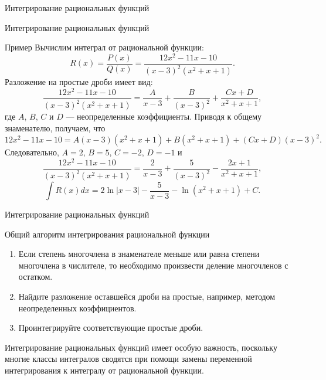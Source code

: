 \documentclass[8pt]{beamer}
\begin{document}
\begin{frame}{Интегрирование рациональных функций}

\end{frame}

\begin{frame}{Интегрирование рациональных функций}

\begin{block}{Пример}
Вычислим интеграл от рациональной функции:
$$R(x) = \frac{P(x)}{Q(x)} =  \frac{12 x^2-11 x-10}{(x-3)^2 \left(x^2+x+1\right)}.$$
Разложение на простые дроби имеет вид:
$$\frac{12 x^2-11 x-10}{(x-3)^2 \left(x^2+x+1\right)} = \frac{A}{x-3} + \frac{B}{(x-3)^2}+\frac{C x+D}{x^2+x+1},$$
где $A$, $B$, $C$ и $D$ --- неопределенные коэффициенты. Приводя к общему знаменателю, получаем, что
$$ 12x^2-11x-10=A(x-3)(x^2+x+1)+B(x^2+x+1)+(Cx+D)(x-3)^2.$$
Следовательно, $A=2$, $B=5$, $C=-2$, $D=-1$ и
$$\frac{12 x^2-11 x-10}{(x-3)^2 \left(x^2+x+1\right)} = \frac{2}{x-3}+\frac{5}{(x-3)^2}-\frac{2 x+1}{x^2+x+1},$$
$$\int R(x)dx = 2\ln|x-3| - \frac{5}{x-3}  - \ln(x^2+x+1)+C.$$
\end{block}
\end{frame}

\begin{frame}{Интегрирование рациональных функций}

\begin{block}{Общий алгоритм интегрирования рациональной функции}
\begin{enumerate}
\item Если степень многочлена в знаменателе меньше или равна степени многочлена в числителе, то необходимо произвести деление многочленов с остатком.
\item Найдите разложение оставшейся дроби на простые, например, методом неопределенных коэффициентов.
\item Проинтегрируйте соответствующие простые дроби.
\end{enumerate}
\end{block}
Интегрирование рациональных функций имеет особую важность, поскольку многие классы интегралов сводятся при помощи замены переменной интегрирования к интегралу от рациональной функции.
\end{frame}
\end{document}
